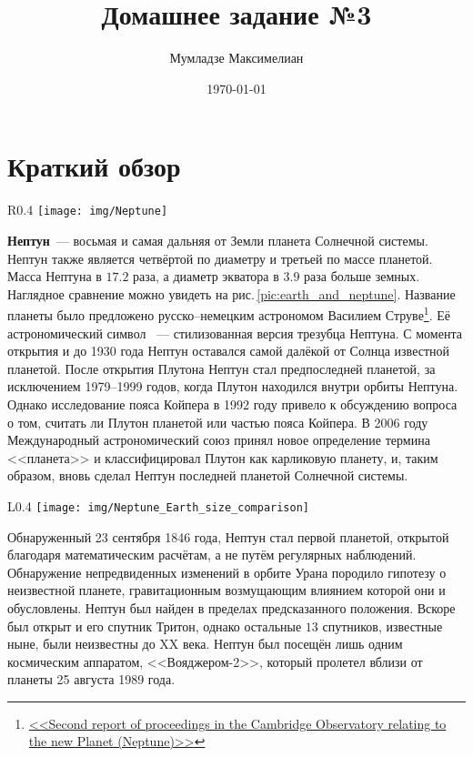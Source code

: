 \documentclass[12pt]{article}
\author{Мумладзе Максимелиан}
\title{Домашнее задание №3}
\date{\today}
\numberwithin{equation}{section} %
\theoremstyle{definition}\newtheorem{defi}{Определение}
\begin{document}
\maketitle

\section{Краткий обзор}

\begin{wrapfigure}{R}{0.4\textwidth}
  \vspace{-1pc}
  \center \texttt{[image: img/Neptune]}
  \caption{Нептун с <<Вояджера-2>>.}
\end{wrapfigure}

\textbf{Нептун}~--- восьмая и самая дальняя от Земли планета Солнечной системы. Нептун также является четвёртой по диаметру и третьей по массе планетой. Масса Нептуна в $17.2$ раза, а диаметр экватора в $3.9$ раза больше земных. Наглядное сравнение можно увидеть на рис.\,\ref{pic:earth_and_neptune}. Название планеты было предложено русско--немецким астрономом Василием Струве\footnote{\href{http://articles.adsabs.harvard.edu/full/seri/AN.../0025/0000164.000.html}{<<Second report of proceedings in the Cambridge Observatory relating to the new Planet (Neptune)>>}}. Её астрономический символ \Neptune ~--- стилизованная версия трезубца Нептуна. С момента открытия и до 1930 года Нептун оставался самой далёкой от Солнца известной планетой. После открытия Плутона Нептун стал предпоследней планетой, за исключением 1979--1999 годов, когда Плутон находился внутри орбиты Нептуна. Однако исследование пояса Койпера в 1992 году привело к обсуждению вопроса о том, считать ли Плутон планетой или частью пояса Койпера. В 2006 году Международный астрономический союз принял новое определение термина <<планета>> и классифицировал Плутон как карликовую планету, и, таким образом, вновь сделал Нептун последней планетой Солнечной системы.


\begin{wrapfigure}{L}{0.4\textwidth}
  \vspace{-1pc}
  \center \texttt{[image: img/Neptune\_Earth\_size\_comparison]}
  \caption{Нептун и Земля.}
  \label{pic:earth_and_neptune}
\end{wrapfigure}

Обнаруженный 23 сентября 1846 года, Нептун стал первой планетой, открытой благодаря математическим расчётам, а не путём регулярных наблюдений. Обнаружение непредвиденных изменений в орбите Урана породило гипотезу о неизвестной планете, гравитационным возмущающим влиянием которой они и обусловлены. Нептун был найден в пределах предсказанного положения. Вскоре был открыт и его спутник Тритон, однако остальные $13$ спутников, известные ныне, были неизвестны до XX века. Нептун был посещён лишь одним космическим аппаратом, <<Вояджером-2>>, который пролетел вблизи от планеты 25 августа 1989 года.
\end{document}

